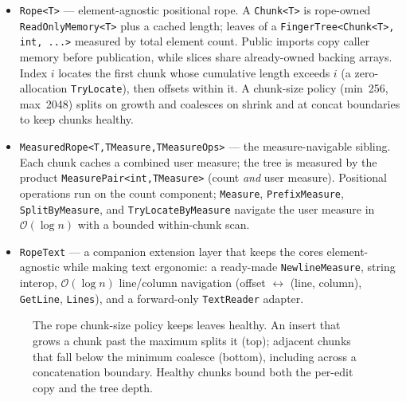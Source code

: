 \documentclass[11pt]{article}
\newcommand{\cs}[1]{\lstinline|#1|}
\newcommand{\bigO}{\ensuremath{\mathcal{O}}}
\begin{document}
\begin{itemize}[leftmargin=1.4em, itemsep=1pt]
  \item \cs{Rope<T>} --- element-agnostic positional rope. A \cs{Chunk<T>} is rope-owned
    \cs{ReadOnlyMemory<T>} plus a cached length; leaves of a \cs{FingerTree<Chunk<T>, int, ...>}
    measured by total element count. Public imports copy caller memory before publication, while slices share
    already-owned backing arrays. Index $i$ locates the first chunk whose cumulative length exceeds $i$ (a
    zero-allocation \cs{TryLocate}), then offsets within it. A chunk-size policy (min~256, max~2048) splits on
    growth and coalesces on shrink and at concat boundaries to keep chunks healthy.
  \item \cs{MeasuredRope<T,TMeasure,TMeasureOps>} --- the measure-navigable sibling. Each chunk caches a
    combined user measure; the tree is measured by the product \cs{MeasurePair<int,TMeasure>} (count
    \emph{and} user measure). Positional operations run on the count component; \cs{Measure},
    \cs{PrefixMeasure}, \cs{SplitByMeasure}, and \cs{TryLocateByMeasure} navigate the user measure in
    $\bigO(\log n)$ with a bounded within-chunk scan.
  \item \cs{RopeText} --- a companion extension layer that keeps the cores element-agnostic while making
    text ergonomic: a ready-made \cs{NewlineMeasure}, string interop, $\bigO(\log n)$ line/column
    navigation (offset $\leftrightarrow$ (line, column), \cs{GetLine}, \cs{Lines}), and a forward-only
    \cs{TextReader} adapter.
\end{itemize}

\begin{figure}[ht]
\centering
{}
\caption{The rope chunk-size policy keeps leaves healthy. An insert that grows a chunk past the maximum
splits it (top); adjacent chunks that fall below the minimum coalesce (bottom), including across a
concatenation boundary. Healthy chunks bound both the per-edit copy and the tree depth.}
\label{fig:chunks}
\end{figure}
\end{document}
